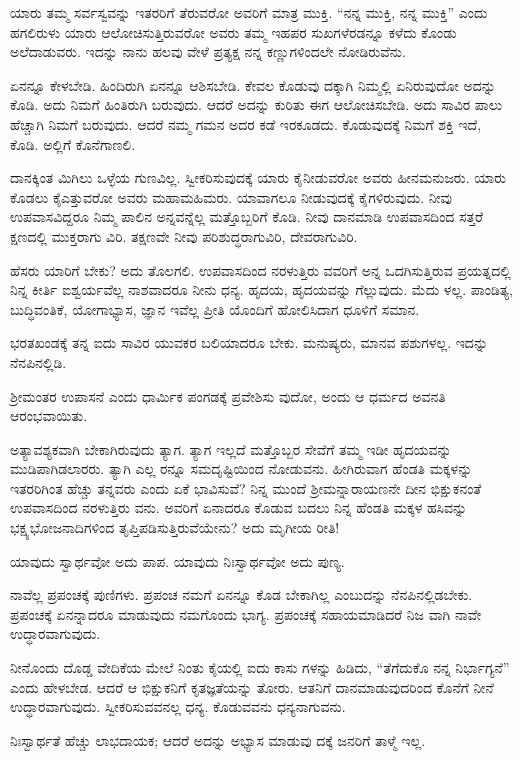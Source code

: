 ಯಾರು ತಮ್ಮ ಸರ್ವಸ್ವವನ್ನು ಇತರರಿಗೆ ತೆರುವರೋ ಅವರಿಗೆ ಮಾತ್ರ ಮುಕ್ತಿ. “ನನ್ನ ಮುಕ್ತಿ, ನನ್ನ ಮುಕ್ತಿ” ಎಂದು ಹಗಲಿರುಳು ಯಾರು ಆಲೋಚಿಸುತ್ತಿರುವರೋ ಅವರು ತಮ್ಮ ಇಹಪರ ಸುಖಗಳೆರಡನ್ನೂ ಕಳೆದು ಕೊಂಡು ಅಲೆದಾಡುವರು. ಇದನ್ನು ನಾನು ಹಲವು ವೇಳೆ ಪ್ರತ್ಯಕ್ಷ ನನ್ನ ಕಣ್ಣುಗಳಿಂದಲೇ ನೋಡಿರುವೆನು.

ಏನನ್ನೂ ಕೇಳಬೇಡಿ. ಹಿಂದಿರುಗಿ ಏನನ್ನೂ ಆಶಿಸಬೇಡಿ. ಕೇವಲ ಕೊಡುವು ದಕ್ಕಾಗಿ ನಿಮ್ಮಲ್ಲಿ ಏನಿರುವುದೋ ಅದನ್ನು ಕೊಡಿ. ಅದು ನಿಮಗೆ ಹಿಂತಿರುಗಿ ಬರುವುದು. ಆದರೆ ಅದನ್ನು ಕುರಿತು ಈಗ ಆಲೋಚಿಸಬೇಡಿ. ಅದು ಸಾವಿರ ಪಾಲು ಹೆಚ್ಚಾಗಿ ನಿಮಗೆ ಬರುವುದು. ಆದರೆ ನಮ್ಮ ಗಮನ ಅದರ ಕಡೆ ಇರಕೂಡದು. ಕೊಡುವುದಕ್ಕೆ ನಿಮಗೆ ಶಕ್ತಿ ಇದೆ, ಕೊಡಿ. ಅಲ್ಲಿಗೆ ಕೊನೆಗಾಣಲಿ.

ದಾನಕ್ಕಿಂತ ಮಿಗಿಲು ಒಳ್ಳೆಯ ಗುಣವಿಲ್ಲ. ಸ್ವೀಕರಿಸುವುದಕ್ಕೆ ಯಾರು ಕೈನೀಡುವರೋ ಅವರು ಹೀನಮನುಜರು. ಯಾರು ಕೊಡಲು ಕೈಎತ್ತುವರೋ ಅವರು ಮಹಾಮಹಿಮರು. ಯಾವಾಗಲೂ ನೀಡುವುದಕ್ಕೆ ಕೈಗಳಿರುವುದು. ನೀವು ಉಪವಾಸವಿದ್ದರೂ ನಿಮ್ಮ ಪಾಲಿನ ಅನ್ನವನ್ನೆಲ್ಲ ಮತ್ತೊಬ್ಬರಿಗೆ ಕೊಡಿ. ನೀವು ದಾನಮಾಡಿ ಉಪವಾಸದಿಂದ ಸತ್ತರೆ ಕ್ಷಣದಲ್ಲಿ ಮುಕ್ತರಾಗು ವಿರಿ. ತಕ್ಷಣವೇ ನೀವು ಪರಿಶುದ್ಧರಾಗುವಿರಿ, ದೇವರಾಗುವಿರಿ.

ಹೆಸರು ಯಾರಿಗೆ ಬೇಕು? ಅದು ತೊಲಗಲಿ. ಉಪವಾಸದಿಂದ ನರಳುತ್ತಿರು ವವರಿಗೆ ಅನ್ನ ಒದಗಿಸುತ್ತಿರುವ ಪ್ರಯತ್ನದಲ್ಲಿ ನಿನ್ನ ಕೀರ್ತಿ ಐಶ್ವರ್ಯವೆಲ್ಲ ನಾಶವಾದರೂ ನೀನು ಧನ್ಯ. ಹೃದಯ, ಹೃದಯವನ್ನು ಗೆಲ್ಲುವುದು. ಮೆದು ಳಲ್ಲ. ಪಾಂಡಿತ್ಯ, ಬುದ್ಧಿವಂತಿಕೆ, ಯೋಗಾಭ್ಯಾಸ, ಜ್ಞಾನ ಇವೆಲ್ಲ ಪ್ರೀತಿ ಯೊಂದಿಗೆ ಹೋಲಿಸಿದಾಗ ಧೂಳಿಗೆ ಸಮಾನ.

ಭರತಖಂಡಕ್ಕೆ ತನ್ನ ಐದು ಸಾವಿರ ಯುವಕರ ಬಲಿಯಾದರೂ ಬೇಕು. ಮನುಷ್ಯರು, ಮಾನವ ಪಶುಗಳಲ್ಲ. ಇದನ್ನು ನೆನಪಿನಲ್ಲಿಡಿ.

ಶ್ರೀಮಂತರ ಉಪಾಸನೆ ಎಂದು ಧಾರ್ಮಿಕ ಪಂಗಡಕ್ಕೆ ಪ್ರವೇಶಿಸು ವುದೋ, ಅಂದು ಆ ಧರ್ಮದ ಅವನತಿ ಆರಂಭವಾಯಿತು.

ಅತ್ಯಾವಶ್ಯಕವಾಗಿ ಬೇಕಾಗಿರುವುದು ತ್ಯಾಗ. ತ್ಯಾಗ ಇಲ್ಲದೆ ಮತ್ತೊಬ್ಬರ ಸೇವೆಗೆ ತಮ್ಮ ಇಡೀ ಹೃದಯವನ್ನು ಮುಡಿಪಾಗಿಡಲಾರರು. ತ್ಯಾಗಿ ಎಲ್ಲ ರನ್ನೂ ಸಮದೃಷ್ಟಿಯಿಂದ ನೋಡುವನು. ಹೀಗಿರುವಾಗ ಹೆಂಡತಿ ಮಕ್ಕಳನ್ನು ಇತರರಿಗಿಂತ ಹೆಚ್ಚು ತನ್ನವರು ಎಂದು ಏಕೆ ಭಾವಿಸುವೆ? ನಿನ್ನ ಮುಂದೆ ಶ್ರೀಮನ್ನಾರಾಯಣನೇ ದೀನ ಭಿಕ್ಷುಕನಂತೆ ಉಪವಾಸದಿಂದ ನರಳುತ್ತಿರು ವನು. ಅವರಿಗೆ ಏನಾದರೂ ಕೊಡುವ ಬದಲು ನಿನ್ನ ಹೆಂಡತಿ ಮಕ್ಕಳ ಹಸಿವನ್ನು ಭಕ್ಷ್ಯಭೋಜನಾದಿಗಳಿಂದ ತೃಪ್ತಿಪಡಿಸುತ್ತಿರುವೆಯೇನು? ಅದು ಮೃಗೀಯ ರೀತಿ!

ಯಾವುದು ಸ್ವಾರ್ಥವೋ ಅದು ಪಾಪ. ಯಾವುದು ನಿಃಸ್ವಾರ್ಥವೋ ಅದು ಪುಣ್ಯ.

ನಾವೆಲ್ಲ ಪ್ರಪಂಚಕ್ಕೆ ಪುಣಿಗಳು. ಪ್ರಪಂಚ ನಮಗೆ ಏನನ್ನೂ ಕೊಡ ಬೇಕಾಗಿಲ್ಲ ಎಂಬುದನ್ನು ನೆನಪಿನಲ್ಲಿಡಬೇಕು. ಪ್ರಪಂಚಕ್ಕೆ ಏನನ್ನಾದರೂ ಮಾಡುವುದು ನಮಗೊಂದು ಭಾಗ್ಯ. ಪ್ರಪಂಚಕ್ಕೆ ಸಹಾಯಮಾಡಿದರೆ ನಿಜ ವಾಗಿ ನಾವೇ ಉದ್ಧಾರವಾಗುವುದು.

ನೀನೊಂದು ದೊಡ್ಡ ವೇದಿಕೆಯ ಮೇಲೆ ನಿಂತು ಕೈಯಲ್ಲಿ ಐದು ಕಾಸು ಗಳನ್ನು ಹಿಡಿದು, “ತೆಗೆದುಕೊ ನನ್ನ ನಿರ್ಭಾಗ್ಯನೆ” ಎಂದು ಹೇಳಬೇಡ. ಆದರೆ ಆ ಭಿಕ್ಷುಕನಿಗೆ ಕೃತಜ್ಞತೆಯನ್ನು ತೋರು. ಆತನಿಗೆ ದಾನಮಾಡುವುದರಿಂದ ಕೊನೆಗೆ ನೀನೆ ಉದ್ಧಾರವಾಗುವುದು. ಸ್ವೀಕರಿಸುವವನಲ್ಲ ಧನ್ಯ. ಕೊಡುವವನು ಧನ್ಯನಾಗುವನು.

ನಿಃಸ್ವಾರ್ಥತೆ ಹೆಚ್ಚು ಲಾಭದಾಯಕ; ಆದರೆ ಅದನ್ನು ಅಭ್ಯಾಸ ಮಾಡುವು ದಕ್ಕೆ ಜನರಿಗೆ ತಾಳ್ಮೆ ಇಲ್ಲ. 

